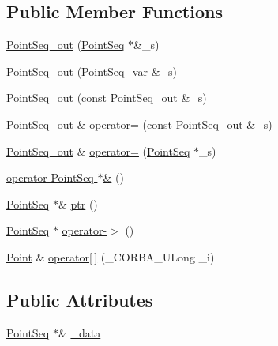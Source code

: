 \subsection*{Public Member Functions}
\begin{DoxyCompactItemize}
\item 
\hyperlink{class_point_seq__out_abeb20879dcf2cdcee45dad80ceee2a0e}{Point\+Seq\+\_\+out} (\hyperlink{class_point_seq}{Point\+Seq} $\ast$\&\+\_\+s)
\item 
\hyperlink{class_point_seq__out_a4eccd9a51de53a264143df6b7e518a89}{Point\+Seq\+\_\+out} (\hyperlink{class_point_seq__var}{Point\+Seq\+\_\+var} \&\+\_\+s)
\item 
\hyperlink{class_point_seq__out_a77e8afbd38fefec90c72007db63d471a}{Point\+Seq\+\_\+out} (const \hyperlink{class_point_seq__out}{Point\+Seq\+\_\+out} \&\+\_\+s)
\item 
\hyperlink{class_point_seq__out}{Point\+Seq\+\_\+out} \& \hyperlink{class_point_seq__out_aced1da47e7ccaef3f7a8dd3b95c221ed}{operator=} (const \hyperlink{class_point_seq__out}{Point\+Seq\+\_\+out} \&\+\_\+s)
\item 
\hyperlink{class_point_seq__out}{Point\+Seq\+\_\+out} \& \hyperlink{class_point_seq__out_a4ea0af10ebf0471c9b9345e7dc4c2854}{operator=} (\hyperlink{class_point_seq}{Point\+Seq} $\ast$\+\_\+s)
\item 
\hyperlink{class_point_seq__out_aafd480dce850dc0ce8da3f8c3a4f3f49}{operator Point\+Seq $\ast$\&} ()
\item 
\hyperlink{class_point_seq}{Point\+Seq} $\ast$\& \hyperlink{class_point_seq__out_a760a8458e395038be33653415266c0b0}{ptr} ()
\item 
\hyperlink{class_point_seq}{Point\+Seq} $\ast$ \hyperlink{class_point_seq__out_ab70cd54ef5d7fd5fa9874054be233f94}{operator-\/$>$} ()
\item 
\hyperlink{struct_point}{Point} \& \hyperlink{class_point_seq__out_a234c059e68d9df7a7352c436b2b4d205}{operator\mbox{[}$\,$\mbox{]}} (\+\_\+\+C\+O\+R\+B\+A\+\_\+\+U\+Long \+\_\+i)
\end{DoxyCompactItemize}
\subsection*{Public Attributes}
\begin{DoxyCompactItemize}
\item 
\hyperlink{class_point_seq}{Point\+Seq} $\ast$\& \hyperlink{class_point_seq__out_a61aa45e168850aa875ebff50e5fce6e9}{\+\_\+data}
\end{DoxyCompactItemize}


